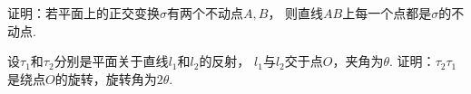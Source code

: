 \begin{example}
证明：若平面上的正交变换\(\sigma\)有两个不动点\(A,B\)，
则直线\(AB\)上每一个点都是\(\sigma\)的不动点.
\end{example}

\begin{example}
设\(\tau_1\)和\(\tau_2\)分别是平面关于直线\(l_1\)和\(l_2\)的反射，
\(l_1\)与\(l_2\)交于点\(O\)，夹角为\(\theta\).
证明：\(\tau_2 \tau_1\)是绕点\(O\)的旋转，旋转角为\(2\theta\).
\end{example}
